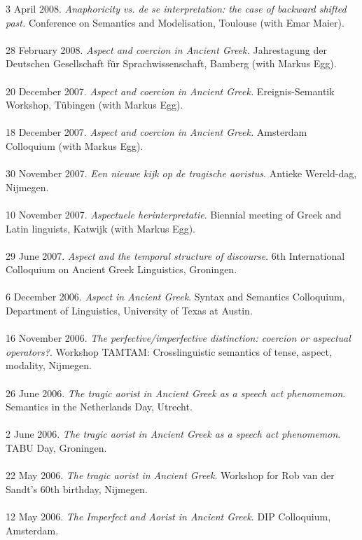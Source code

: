 \documentclass[a4paper,11pt]{article}
\begin{document}
3 April 2008. \emph{Anaphoricity vs. de se interpretation: the case of backward shifted past.} Conference on Semantics and Modelisation, Toulouse (with Emar Maier).\\\\
28 February 2008. \emph{Aspect and coercion in Ancient Greek.} Jahrestagung der Deutschen Gesellschaft f\"ur Sprachwissenschaft, Bamberg (with Markus Egg).\\\\
20 December 2007. \emph{Aspect and coercion in Ancient Greek.} Ereignis-Semantik Workshop, T\"ubingen (with Markus Egg).\\\\
18 December 2007. \emph{Aspect and coercion in Ancient Greek.} Amsterdam Colloquium (with Markus Egg).\\\\ 
30 November 2007. \emph{Een nieuwe kijk op de tragische aoristus}. Antieke Wereld-dag, Nijmegen.\\\\
10 November 2007. \emph{Aspectuele herinterpretatie}. Biennial meeting of Greek and Latin linguists, Katwijk (with Markus Egg).\\\\
29 June 2007. \emph{Aspect and the temporal structure of discourse}. 6th International Colloquium on Ancient Greek Linguistics, Groningen.\\\\
6 December 2006. \emph{Aspect in Ancient Greek}. Syntax and Semantics Colloquium, Department of Linguistics, University of Texas at Austin.\\\\
16 November 2006. \emph{The perfective/imperfective distinction: coercion or aspectual operators?}. Workshop TAMTAM: Crosslinguistic semantics of tense, aspect, modality, Nijmegen.\\\\
26 June 2006. \emph{The tragic aorist in Ancient Greek as a speech act phenomemon}. Semantics in the Netherlands Day, Utrecht.\\\\
2 June 2006. \emph{The tragic aorist in Ancient Greek as a speech act phenomemon}. TABU Day, Groningen.\\\\
22 May 2006. \emph{The tragic aorist in Ancient Greek}. Workshop for Rob van der Sandt's 60th birthday, Nijmegen.\\\\
12 May 2006. \emph{The Imperfect and Aorist in Ancient Greek}. DIP Colloquium, Amsterdam.\\\\
\end{document}
